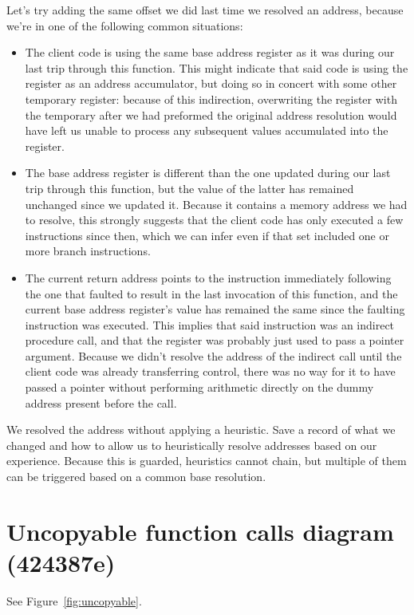 \documentclass[12pt,letterpaper,openright]{report}
\begin{document}
Let's try adding the same offset we did last time we resolved an address,
because we're in one of the following common situations:
\begin{itemize}
\item The client code is using the same base address register as it was
	during our last trip through this function.  This might indicate that
	said code is using the register as an address accumulator, but doing
	so in concert with some other temporary register: because of this
	indirection, overwriting the register with the temporary after we
	had preformed the original address resolution would have left us
	unable to process any subsequent values accumulated into the register.
\item The base address register is different than the one updated during our
	last trip through this function, but the value of the latter has
	remained unchanged since we updated it.  Because it contains a memory
	address we had to resolve, this strongly suggests that the client code
	has only executed a few instructions since then, which we can infer
	even if that set included one or more branch instructions.
\item The current return address points to the instruction immediately
	following the one that faulted to result in the last invocation of
	this function, and the current base address register's value has
	remained the same since the faulting instruction was executed.  This
	implies that said instruction was an indirect procedure call, and that
	the register was probably just used to pass a pointer argument.
	Because we didn't resolve the address of the indirect call until the
	client code was already transferring control, there was no way for it
	to have passed a pointer without performing arithmetic directly on the
	dummy address present before the call.
\end{itemize}

We resolved the address without applying a heuristic.  Save a record of what we
changed and how to allow us to heuristically resolve addresses based on our
experience.  Because this is guarded, heuristics cannot chain, but multiple of
them can be triggered based on a common base resolution.


\section{Uncopyable function calls diagram (424387e)}

See Figure~\ref{fig:uncopyable}.
\end{document}
